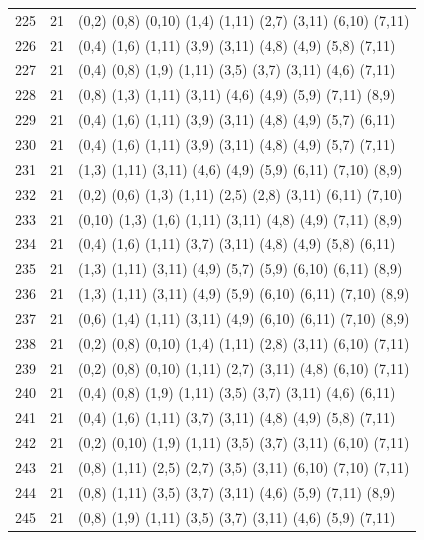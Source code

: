 \begin{appendix}
{\begin{longtable}{lll}
    225& 21 & (0,2)   (0,8)   (0,10)  (1,4)   (1,11)  (2,7)   (3,11)  (6,10)  (7,11)\\
    226& 21 & (0,4)   (1,6)   (1,11)  (3,9)   (3,11)  (4,8)   (4,9)   (5,8)   (7,11)\\
    227& 21 & (0,4)   (0,8)   (1,9)   (1,11)  (3,5)   (3,7)   (3,11)  (4,6)   (7,11)\\
    228& 21 & (0,8)   (1,3)   (1,11)  (3,11)  (4,6)   (4,9)   (5,9)   (7,11)  (8,9)\\
    229& 21 & (0,4)   (1,6)   (1,11)  (3,9)   (3,11)  (4,8)   (4,9)   (5,7)   (6,11)\\
    230& 21 & (0,4)   (1,6)   (1,11)  (3,9)   (3,11)  (4,8)   (4,9)   (5,7)   (7,11)\\
    231& 21 & (1,3)   (1,11)  (3,11)  (4,6)   (4,9)   (5,9)   (6,11)  (7,10)  (8,9)\\
    232& 21 & (0,2)   (0,6)   (1,3)   (1,11)  (2,5)   (2,8)   (3,11)  (6,11)  (7,10)\\
    233& 21 & (0,10)  (1,3)   (1,6)   (1,11)  (3,11)  (4,8)   (4,9)   (7,11)  (8,9)\\
    234& 21 & (0,4)   (1,6)   (1,11)  (3,7)   (3,11)  (4,8)   (4,9)   (5,8)   (6,11)\\
    235& 21 & (1,3)   (1,11)  (3,11)  (4,9)   (5,7)   (5,9)   (6,10)  (6,11)  (8,9)\\
    236& 21 & (1,3)   (1,11)  (3,11)  (4,9)   (5,9)   (6,10)  (6,11)  (7,10)  (8,9)\\
    237& 21 & (0,6)   (1,4)   (1,11)  (3,11)  (4,9)   (6,10)  (6,11)  (7,10)  (8,9)\\
    238& 21 & (0,2)   (0,8)   (0,10)  (1,4)   (1,11)  (2,8)   (3,11)  (6,10)  (7,11)\\
    239& 21 & (0,2)   (0,8)   (0,10)  (1,11)  (2,7)   (3,11)  (4,8)   (6,10)  (7,11)\\
    240& 21 & (0,4)   (0,8)   (1,9)   (1,11)  (3,5)   (3,7)   (3,11)  (4,6)   (6,11)\\
    241& 21 & (0,4)   (1,6)   (1,11)  (3,7)   (3,11)  (4,8)   (4,9)   (5,8)   (7,11)\\
    242& 21 & (0,2)   (0,10)  (1,9)   (1,11)  (3,5)   (3,7)   (3,11)  (6,10)  (7,11)\\
    243& 21 & (0,8)   (1,11)  (2,5)   (2,7)   (3,5)   (3,11)  (6,10)  (7,10)  (7,11)\\
    244& 21 & (0,8)   (1,11)  (3,5)   (3,7)   (3,11)  (4,6)   (5,9)   (7,11)  (8,9)\\
    245& 21 & (0,8)   (1,9)   (1,11)  (3,5)   (3,7)   (3,11)  (4,6)   (5,9)   (7,11)\\

\end{longtable}}
\end{appendix}
